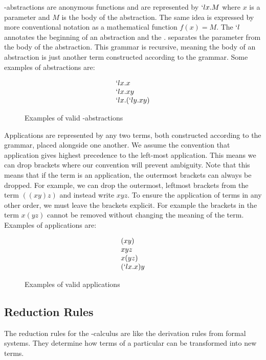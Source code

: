   \lam-abstractions are anonymous functions and are represented by $`lx.M$ where $x$ is a parameter and $M$ is the body of the abstraction. 
  The same idea is expressed by more conventional notation as a mathematical function $f(x) = M$. 
  The $`l$ annotates the beginning of an abstraction and the $.$ separates the parameter from the body of the abstraction.
  This grammar is recursive, meaning the body of an abstraction is just another term constructed according to the grammar. 
  Some examples of abstractions are:
  
  \begin{figure}[!h]
    \[
      \begin{array}{l}
      `lx.x \\
      `lx.xy \\
      `lx.(`ly.xy)
      \end{array}
    \]
  \caption{Examples of valid \lam-abstractions}
  \end{figure}
  
  Applications are represented by any two terms, 
    both constructed according to the grammar, 
  placed alongside one another. 
  We assume the convention that application gives highest precedence to the left-most application. 
  This means we can drop brackets where our convention will prevent ambiguity.
  Note that this means that if the term is an application, the outermost brackets can always be dropped.
  For example, we can drop the outermost, leftmost brackets from the term $((xy)z)$ and instead write $xyz$.
  To ensure the application of terms in any other order, we must leave the brackets explicit.
  For example the brackets in the term $x(yz)$ cannot be removed without changing the meaning of the term.
  Examples of applications are:
    \begin{figure}[!h]
      \[
        \begin{array}{l}
        (xy) \\
        xyz \\
        x(yz) \\
        (`lx.x)y
        \end{array}
      \]
    \caption{Examples of valid applications}
    \end{figure}

\subsection{Reduction Rules}
  
  The reduction rules for the \lam-calculus are like the derivation rules from formal systems.
  They determine how terms of a particular can be transformed into new terms.
  
